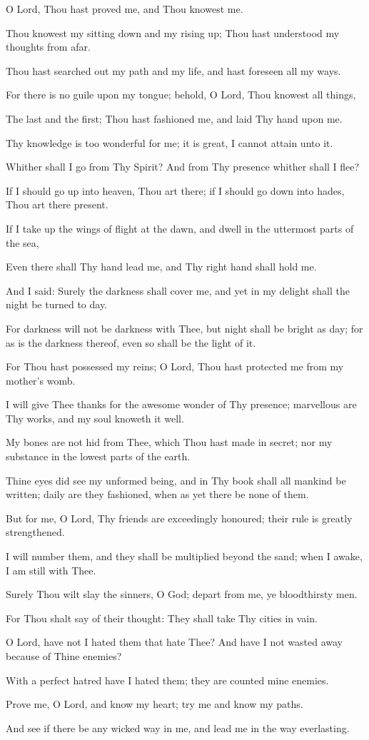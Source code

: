 O Lord, Thou hast proved me, and Thou knowest me.

Thou knowest my sitting down and my rising up; Thou hast understood my thoughts from afar.

Thou hast searched out my path and my life, and hast foreseen all my ways.

For there is no guile upon my tongue; behold, O Lord, Thou knowest all things,

The last and the first; Thou hast fashioned me, and laid Thy hand upon me.

Thy knowledge is too wonderful for me; it is great, I cannot attain unto it.

Whither shall I go from Thy Spirit? And from Thy presence whither shall I flee?

If I should go up into heaven, Thou art there; if I should go down into hades, Thou art there present.

If I take up the wings of flight at the dawn, and dwell in the uttermost parts of the sea,

Even there shall Thy hand lead me, and Thy right hand shall hold me.

And I said: Surely the darkness shall cover me, and yet in my delight shall the night be turned to day.

For darkness will not be darkness with Thee, but night shall be bright as day; for as is the darkness thereof, even so shall be the light of it.

For Thou hast possessed my reins; O Lord, Thou hast protected me from my mother's womb.

I will give Thee thanks for the awesome wonder of Thy presence; marvellous are Thy works, and my soul knoweth it well.

My bones are not hid from Thee, which Thou hast made in secret; nor my substance in the lowest parts of the earth.

Thine eyes did see my unformed being, and in Thy book shall all mankind be written; daily are they fashioned, when as yet there be none of them.

But for me, O Lord, Thy friends are exceedingly honoured; their rule is greatly strengthened.

I will number them, and they shall be multiplied beyond the sand; when I awake, I am still with Thee.

Surely Thou wilt slay the sinners, O God; depart from me, ye bloodthirsty men.

For Thou shalt say of their thought: They shall take Thy cities in vain.

O Lord, have not I hated them that hate Thee? And have I not wasted away because of Thine enemies?

With a perfect hatred have I hated them; they are counted mine enemies.

Prove me, O Lord, and know my heart; try me and know my paths.

And see if there be any wicked way in me, and lead me in the way everlasting.
